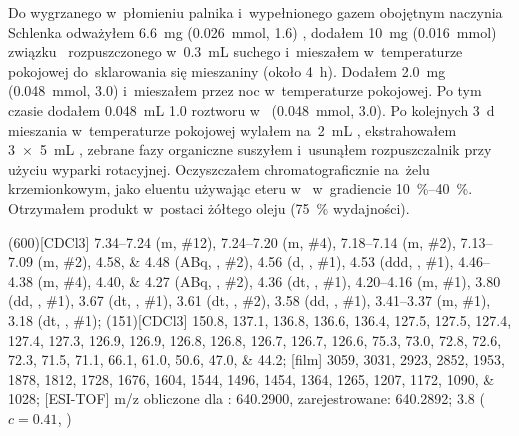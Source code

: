 Do wygrzanego w~płomieniu palnika i~wypełnionego gazem obojętnym naczynia Schlenka odważyłem
	\SI{6.6}{\milli\gram} (\SI{0.026}{\milli\mol}, \SI{1.6}{\equiv}) ,
	dodałem \SI{10}{\milli\gram} (\SI{0.016}{\milli\mol}) związku~
	rozpuszczonego w~\SI{0.3}{\milli\liter} suchego  i~mieszałem w~temperaturze pokojowej
	do~sklarowania się mieszaniny (około \SI{4}{\hour}).
Dodałem \SI{2.0}{\milli\gram} (\SI{0.048}{\milli\mol}, \SI{3.0}{\equiv}) 
	i~mieszałem przez noc w~temperaturze pokojowej.
Po tym czasie dodałem \SI{0.048}{\milli\liter} \SI{1.0}{\Molar} roztworu  w~
	(\SI{0.048}{\milli\mol}, \SI{3.0}{\equiv}).
Po kolejnych \SI{3}{\day} mieszania w~temperaturze pokojowej wylałem na~\SI{2}{\milli\liter} ,
	ekstrahowałem \SI[product-units = single]{3 x 5}{\mL} ,
	zebrane fazy organiczne suszyłem  i~usunąłem rozpuszczalnik przy użyciu wyparki rotacyjnej.
Oczyszczałem chromatograficznie na~żelu krzemionkowym, jako eluentu używając eteru
	 w~ w~gradiencie \SIrange{10}{40}{\percent}.
Otrzymałem produkt w~postaci żółtego oleju (\SI{75}{\percent} wydajności).

\begin{fullexp}
	\NMR(600)[CDCl3] \numrange{7.34}{7.24} (m, \#{12}), \numrange{7.24}{7.20} (m, \#{4}), \numrange{7.18}{7.14} (m, \#{2}), \numrange{7.13}{7.09} (m, \#{2}), \numlist{4.58;4.48} (ABq, , \#{2}), \num{4.56} (d, , \#{1}), \num{4.53} (ddd, , \#{1}), \numrange{4.46}{4.38} (m, \#{4}), \numlist{4.40;4.27} (ABq, , \#{2}), \num{4.36} (dt, , \#{1}), \numrange{4.20}{4.16} (m, \#{1}), \num{3.80} (dd, , \#{1}), \num{3.67} (dt, , \#{1}), \num{3.61} (dt, , \#{2}), \num{3.58} (dd, , \#{1}), \numrange{3.41}{3.37} (m, \#{1}), \num{3.18} (dt, , \#{1});
	(151)[CDCl3] \numlist{150.8; 137.1; 136.8; 136.6; 136.4; 127.5; 127.5; 127.4; 127.4; 127.3; 126.9; 126.9; 126.8; 126.8; 126.7; 126.7; 126.6; 75.3; 73.0; 72.8; 72.6; 72.3; 71.5; 71.1; 66.1; 61.0; 50.6; 47.0; 44.2};
	[film] \numlist{3059; 3031; 2923; 2852; 1953; 1878; 1812; 1728; 1676; 1604; 1544; 1496; 1454; 1364; 1265; 1207; 1172; 1090; 1028};
	[ESI-TOF] m/z obliczone dla : \num{640.2900}, zarejestrowane: \num{640.2892};
	\data{[$\alpha^{23}_D$]~$=$} \num{3.8} ($c = 0.41$, )
\end{fullexp}

